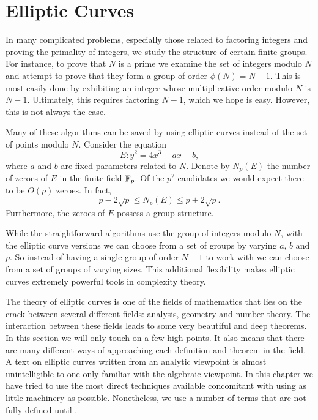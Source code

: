 \chapter{Elliptic Curves}
\label{Elliptic:Chap}

\def\sumonlattice#1#2{\sum_{\scriptstyle#1 \in #2 \atop\scriptstyle #1 \not=0}}

In many complicated problems, especially those related to factoring
integers and proving the primality of integers, we study the structure
of certain finite groups.  For instance, to prove that $N$ is a prime
we examine the set of integers modulo $N$ and attempt to prove that
they form a group of order $\phi(N)= N-1$.  This is most easily done
by exhibiting an integer whose multiplicative order modulo $N$ is $N-1$.
Ultimately, this requires factoring $N-1$, which we hope is easy.
However, this is not always the case.

Many of these algorithms can be saved by using elliptic curves instead
of the set of points modulo $N$.  Consider the equation 
\[
E: y^2 = 4x^3 - a x - b,
\]
where $a$ and $b$ are fixed parameters related to $N$.  Denote by
$N_p(E)$ the number of zeroes of $E$ in the finite field $\mathbb{F}_p$.  Of
the $p^2$ candidates we would expect there to be $O(p)$ zeroes.  In
fact,
\begin{equation}\label{Ell:Simp:RH:Eq}
p - 2 \sqrt{p} \le N_p(E) \le p + 2 \sqrt{p}.
\end{equation}
Furthermore, the zeroes of $E$ possess a group structure.

While the straightforward algorithms use the group of integers modulo
$N$, with the elliptic curve versions we can choose from a set of
groups by varying $a$, $b$ and $p$.  So instead of having a single
group of order $N-1$ to work with we can choose from a set of groups
of varying sizes.  This additional flexibility makes elliptic curves
extremely powerful tools in complexity theory.

The theory of elliptic curves is one of the fields of mathematics that
lies on the crack between several different fields: analysis, geometry
and number theory.  The interaction between these fields leads to some
very beautiful and deep theorems.  In this section we will only touch
on a few high points.  It also means that there are many different
ways of approaching each definition and theorem in the field.  A text
on elliptic curves written from an analytic viewpoint is almost
unintelligible to one only familiar with the algebraic viewpoint.  In
this chapter we have tried to use the most direct techniques available
concomitant with using as little machinery as possible.  Nonetheless,
we use a number of terms that are not fully defined until
.  

